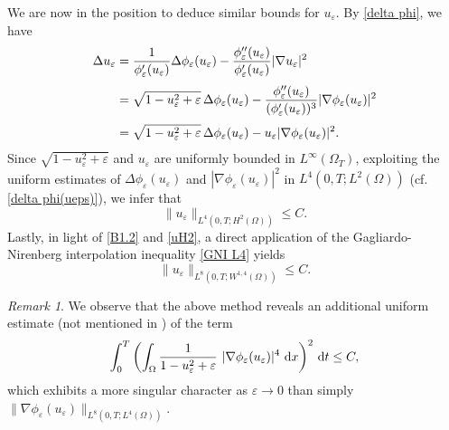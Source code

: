\documentclass[11pt,  reqno]{amsart}%
\theoremstyle{plain}
\theoremstyle{definition}
\theoremstyle{remark}
\newtheorem{remark}[theorem]{Remark}
\numberwithin{equation}{section}
\newcommand{\ve}{\varepsilon}
\newcommand{\dx}{\textup{d}x}
\newcommand{\dt}{\textup{d}t}
\begin{document}
We are now in the position to deduce similar bounds for  $u_\ve$.
By \eqref{delta phi}, we have
\begin{align}
    \Delta u_\ve &= \dfrac{1}{\phi_\ve'(u_\ve)}\Delta \phi_\ve(u_\ve) - \dfrac{\phi_\ve''(u_\ve)}{\phi_\ve'(u_\ve)}|\nabla u_\ve|^2
\notag    
    \\[3pt]
    &= \sqrt{1 -u^2_\ve+\ve} \, \Delta \phi_\ve(u_\ve)- \dfrac{\phi_\ve''(u_\ve)}{(\phi_\ve'(u_\ve))^3} |\nabla \phi_\ve(u_\ve)|^2
\notag    
     \\[3pt]
    &=\sqrt{1 -u^2_\ve+\ve} \,  \Delta \phi_\ve(u_\ve)- u_\ve |\nabla \phi_\ve(u_\ve)|^2.
    \label{relation Delta u}
\end{align}
Since $\sqrt{1 -u^2_\ve+\ve}$ and $u_\ve$ are uniformly bounded in $L^\infty(\Omega_T)$, exploiting the uniform estimates of $\Delta \phi_\ve(u_\ve)$ and $|\nabla \phi_\ve(u_\ve)|^2$ in $L^4(0,T; L^2(\Omega))$ (cf. \eqref{delta phi(ueps)}), we infer that
\begin{equation}
    \label{uH2}
    \|u_\ve\|_{L^4(0,T;H^2(\Omega))} \le C.
\end{equation}
Lastly, in light of \eqref{B1.2} and \eqref{uH2}, a direct application of the Gagliardo-Nirenberg interpolation inequality \eqref{GNI L4} yields
   \begin{equation}
        \label{uW14}
        \|u_\ve\|_{L^8(0,T;W^{1,4}(\Omega))} \le C.
    \end{equation}
   
 \medskip  

\begin{remark}
We observe that the above method reveals an additional uniform estimate (not mentioned in \cite{CM2023}) of the term
$$
\int_0^T\left( \int_\Omega \dfrac{1}{1- u_\ve^2+\varepsilon} \ |\nabla \phi_\ve(u_\ve)|^4 \ \dx \right)^2 \, \dt \leq C,
$$
which exhibits a more singular character as $\ve \to 0$ than simply $\| \nabla \phi_\ve(u_\ve) \|_{L^8(0,T; L^4(\Omega))}$.
\end{remark}
\end{document}
